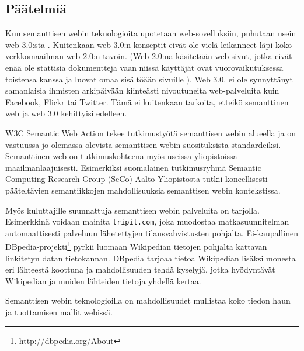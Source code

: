 \documentclass[finnish]{tktltiki2}
\theoremstyle{definition}
\theoremstyle{remark}
\begin{document}
\subsection{Päätelmiä}

Kun semanttisen webin teknologioita upotetaan web-sovelluksiin, puhutaan usein web 3.0:sta \cite{WEB30}. Kuitenkaan web 3.0:n konseptit eivät ole vielä leikanneet läpi koko verkkomaailman web 2.0:n tavoin. (Web 2.0:na käsitetään web-sivut, jotka eivät enää ole stattisia dokumentteja vaan niissä käyttäjät ovat vuorovaikutuksessa toistensa kanssa ja luovat omaa sisältöään sivuille \cite{WEB20}). Web 3.0. ei ole synnyttänyt samanlaisia ihmisten arkipäivään kiinteästi nivoutuneita  web-palveluita kuin Facebook, Flickr tai Twitter. Tämä ei kuitenkaan tarkoita, etteikö semanttinen web ja web 3.0 kehittyisi edelleen. 

W3C Semantic Web Action tekee tutkimustyötä semanttisen webin alueella ja on vastuussa jo olemassa olevista semanttisen webin suosituksista standardeiksi. Semanttinen web on tutkimuskohteena myös useissa yliopistoissa maailmanlaajuisesti. Esimerkiksi suomalainen tutkimusryhmä Semantic Computing Research Group (SeCo) Aalto Yliopistosta tutkii koneellisesti pääteltävien semantiikkojen mahdollisuuksia semanttisen webin kontekstissa.  

Myös kuluttajille suunnattuja semanttisen webin palveluita on tarjolla. Esimerkkinä voidaan mainita \texttt{tripit.com}, joka muodostaa matkasuunnitelman automaattisesti palveluun lähetettyjen tilausvahvistusten pohjalta. Ei-kaupallinen DBpedia-projekti\footnote{http://dbpedia.org/About} pyrkii luomaan Wikipedian tietojen pohjalta kattavan linkitetyn datan tietokannan. DBpedia tarjoaa tietoa Wikipedian lisäksi monesta eri lähteestä koottuna ja mahdollisuuden tehdä kyselyjä, jotka hyödyntävät Wikipedian ja muiden lähteiden tietoja yhdellä kertaa.

Semanttisen webin teknologioilla on mahdollisuudet mullistaa koko tiedon haun ja tuottamisen mallit webissä.  


%
%
% 
%
\newpage



\end{document}
